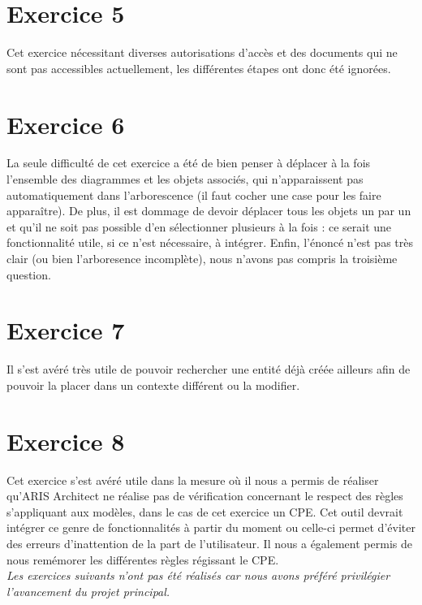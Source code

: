\section{Exercice 5}

Cet exercice nécessitant diverses autorisations d'accès et des documents qui ne sont pas accessibles actuellement, les différentes étapes ont donc été ignorées.

\section{Exercice 6}

La seule difficulté de cet exercice a été de bien penser à déplacer à la fois l'ensemble des diagrammes et les objets associés, qui n’apparaissent pas automatiquement dans l'arborescence (il faut cocher une case pour les faire apparaître). De plus, il est dommage de devoir déplacer tous les objets un par un et qu'il ne soit pas possible d'en sélectionner plusieurs à la fois : ce serait une fonctionnalité utile, si ce n'est nécessaire, à intégrer. Enfin, l'énoncé n'est pas très clair (ou bien l'arboresence incomplète), nous n'avons pas compris la troisième question.

\section{Exercice 7}

Il s'est avéré très utile de pouvoir rechercher une entité déjà créée ailleurs afin de pouvoir la placer dans un contexte différent ou la modifier. \\

\section{Exercice 8}

Cet exercice s'est avéré utile dans la mesure où il nous a permis de réaliser qu'ARIS Architect ne réalise pas de vérification concernant le respect des règles s'appliquant aux modèles, dans le cas de cet exercice un CPE. Cet outil devrait intégrer ce genre de fonctionnalités à partir du moment ou celle-ci permet d’éviter des erreurs d’inattention de la part de l'utilisateur. Il nous a également permis de nous remémorer les différentes règles régissant le CPE. \\

\it{Les exercices suivants n'ont pas été réalisés car nous avons préféré privilégier l'avancement du projet principal.} \\

